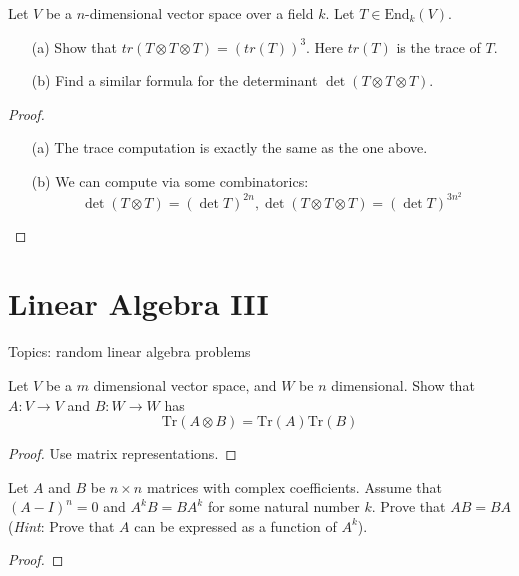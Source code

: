 \begin{prob}[S2010-Q4]
    Let \(V\) be a \(n\)-dimensional vector space over a field \(k\). Let \(T \in \text{End}_k(V)\).
    \begin{itemize}
        \item[(a)] Show that \(tr(T \otimes T \otimes T) = (tr(T))^3\). Here \(tr(T)\) is the trace of \(T\).
        \item[(b)] Find a similar formula for the determinant \(\det(T \otimes T \otimes T)\).
    \end{itemize}
\end{prob}
\begin{proof}
    \begin{itemize}
        \item[(a)] The trace computation is exactly the same as the one above. 
        \item[(b)] We can compute via some combinatorics:
        \begin{equation*}
            \det(T\otimes T)=(\det T)^{2n}, \det(T\otimes T\otimes T)=(\det T)^{3n^2}
        \end{equation*}
    \end{itemize}
\end{proof}








\chapter{Linear Algebra III}
Topics: random linear algebra problems


\begin{prop}
    Let $V$ be a $m$ dimensional vector space, and $W$ be $n$ dimensional. Show that $A:V\to V$ and $B: W\to W$ has 
    \begin{equation*}
        \text{Tr}(A\otimes B)=\text{Tr}(A)\text{Tr}(B)
    \end{equation*}
\end{prop}
\begin{proof}
    Use matrix representations.
\end{proof}


\begin{prob}[S2013-Q5]
    Let \(A\) and \(B\) be \(n \times n\) matrices with complex coefficients. Assume that \((A - I)^n = 0\) and \(A^k B = BA^k\) for some natural number \(k\). Prove that \(AB = BA\) (\textit{Hint}: Prove that \(A\) can be expressed as a function of \(A^k\)).
\end{prob}
\begin{proof}
    
\end{proof}


